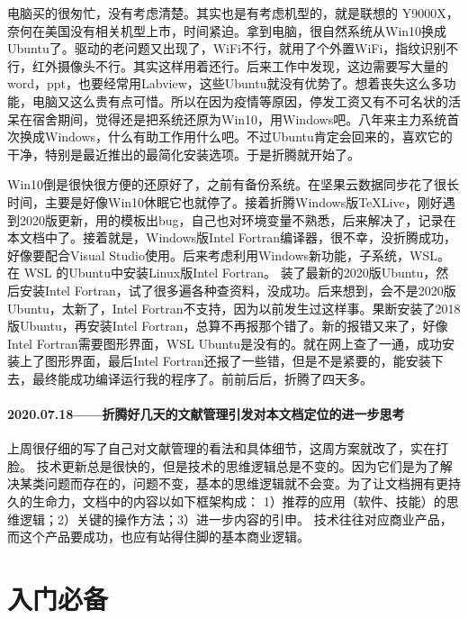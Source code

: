 \documentclass[cn,11pt,chinese,twoside]{elegantbook}
\begin{document}
电脑买的很匆忙，没有考虑清楚。其实也是有考虑机型的，就是联想的 Y9000X，奈何在美国没有相关机型上市，时间紧迫。拿到电脑，很自然系统从Win10换成Ubuntu了。驱动的老问题又出现了，WiFi不行，就用了个外置WiFi，指纹识别不行，红外摄像头不行。其实这样用着还行。后来工作中发现，这边需要写大量的word，ppt，也要经常用Labview，这些Ubuntu就没有优势了。想着丧失这么多功能，电脑又这么贵有点可惜。所以在因为疫情等原因，停发工资又有不可名状的活呆在宿舍期间，觉得还是把系统还原为Win10，用Windows吧。八年来主力系统首次换成Windows，什么有助工作用什么吧。不过Ubuntu肯定会回来的，喜欢它的干净，特别是最近推出的最简化安装选项。于是折腾就开始了。

Win10倒是很快很方便的还原好了，之前有备份系统。在坚果云数据同步花了很长时间，主要是好像Win10休眠它也就停了。接着折腾Windows版\TeX Live，刚好遇到2020版更新，用的模板出bug，自己也对环境变量不熟悉，后来解决了，记录在本文档中了。接着就是，Windows版Intel Fortran编译器，很不幸，没折腾成功，好像要配合Visual Studio使用。后来考虑利用Windows新功能，子系统，WSL。在 WSL 的Ubuntu中安装Linux版Intel Fortran。 装了最新的2020版Ubuntu，然后安装Intel Fortran，试了很多遍各种查资料，没成功。后来想到，会不是2020版Ubuntu，太新了，Intel Fortran不支持，因为以前发生过这样事。果断安装了2018版Ubuntu，再安装Intel Fortran，总算不再报那个错了。新的报错又来了，好像Intel Fortran需要图形界面，WSL Ubuntu是没有的。就在网上查了一通，成功安装上了图形界面，最后Intel Fortran还报了一些错，但是不是紧要的，能安装下去，最终能成功编译运行我的程序了。前前后后，折腾了四天多。




\subsection*{2020.07.18——折腾好几天的文献管理引发对本文档定位的进一步思考}
上周很仔细的写了自己对文献管理的看法和具体细节，这周方案就改了，实在打脸。
技术更新总是很快的，但是技术的思维逻辑总是不变的。因为它们是为了解决某类问题而存在的，问题不变，基本的思维逻辑就不会变。为了让文档拥有更持久的生命力，文档中的内容以如下框架构成：
1）推荐的应用（软件、技能）的思维逻辑；2）关键的操作方法；3）进一步内容的引申。
技术往往对应商业产品，而这个产品要成功，也应有站得住脚的基本商业逻辑。




\part{入门必备}

\end{document}
